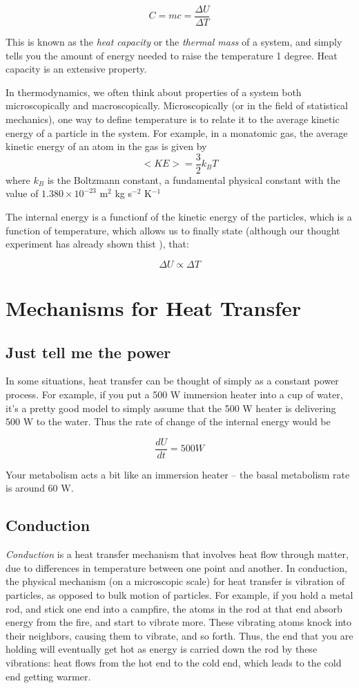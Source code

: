 $$C = mc = \frac{\Delta U}{\Delta T}$$ 

This is known as the {\it heat capacity} or the {\it thermal mass} of a system, and simply tells you the amount of energy needed to raise the temperature 1 degree. Heat capacity is an extensive property.

In thermodynamics, we often think about properties of a system both microscopically and macroscopically. Microscopically (or in the field of statistical mechanics), one way to define temperature is to relate it to the average kinetic energy of a particle in the system.  For example, in a monatomic gas, the average kinetic energy of an atom in the gas is given by
$$<KE> = \frac{3}{2} k_B T$$
where $k_B$ is the Boltzmann constant, a fundamental physical constant with the value of $1.380 \times 10^{-23}$ m$^2$ kg s$^{-2}$ K$^{-1}$

The internal energy is a functionf of the kinetic energy of the particles, which is a function of temperature, which allows us to finally state (although our thought experiment has already shown thist ), that:

$$\Delta U \propto \Delta T$$


\section{Mechanisms for Heat Transfer}

\subsection{Just tell me the power}

In some situations, heat transfer can be thought of simply as a constant power process.  For example, if you put a 500 W immersion heater into a cup of water, it's a pretty good model to simply assume that the 500 W heater is delivering 500 W to the water.  Thus the rate of change of the internal energy would be

$$\frac{dU}{dt} = 500 W$$

Your metabolism acts a bit like an immersion heater -- the basal metabolism rate is around 60 W.

\subsection{Conduction}

{\it Conduction} is a heat transfer mechanism that involves heat flow through matter, due to differences in temperature between one point and another.  In conduction, the physical mechanism (on a microscopic scale) for heat transfer is vibration of particles, as opposed to bulk motion of particles. For example, if you hold a metal rod, and stick one end into a campfire, the atoms in the rod at that end absorb energy from the fire, and start to vibrate more.  These vibrating atoms knock into their neighbors, causing them to vibrate, and so forth.  Thus, the end that you are holding will eventually get hot as energy is carried down the rod by these vibrations: heat flows from the hot end to the cold end, which leads to the cold end getting warmer. 

